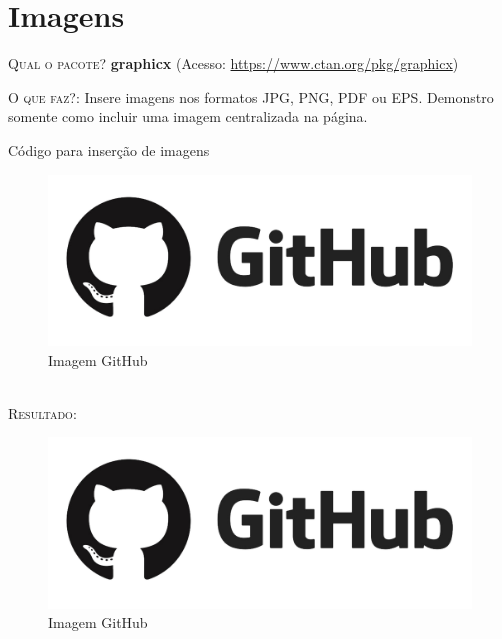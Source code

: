 \documentclass[a4paper,12pt,oneside,openright,extrafontsizes,openbib]{memoir}
\begin{document}
{%
\chapter{Imagens}

\textsc{Qual o pacote?} \textbf{graphicx} (Acesso: \url{https://www.ctan.org/pkg/graphicx})

\textsc{O que faz?}: Insere imagens nos formatos JPG, PNG, PDF ou EPS. Demonstro somente como incluir uma imagem centralizada na página.

\begin{codex}{Código para inserção de imagens}
\begin{figure}[h!]
\begin{center}
\includegraphics[scale=.30]{./img/github.png}
\caption{Imagem GitHub}
\label{fig:github}
\end{center}
\end{figure}
\end{codex}
\ \\

\textsc{Resultado:}

\begin{figure}[h!]
	\begin{center}
		\includegraphics[scale=.30]{./img/github.png}
		\caption{Imagem GitHub}
		\label{fig:github}
	\end{center}
\end{figure}

}
\end{document}
